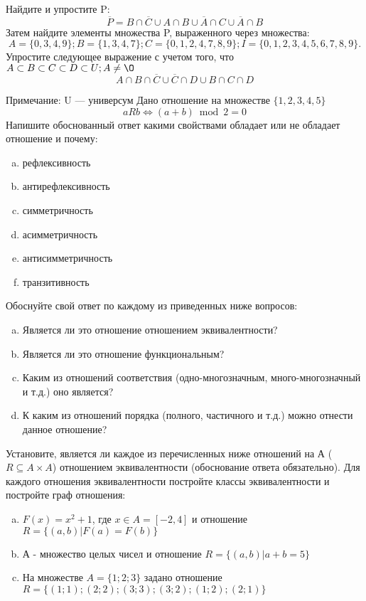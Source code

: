 \documentclass[10pt]{exam}
\begin{document}
\begin{questions}
\question
Найдите и упростите P:
\begin{equation*}
\overline{P} = B \cap \overline{C} \cup A \cap B \cup \overline{A} \cap C \cup \overline{A} \cap B
\end{equation*}
Затем найдите элементы множества P, выраженного через множества:
\begin{equation*}
A = \{0, 3, 4, 9\}; 
B = \{1, 3, 4, 7\};
C = \{0, 1, 2, 4, 7, 8, 9\};
I = \{0, 1, 2, 3, 4, 5, 6, 7, 8, 9\}.
\end{equation*}\question
Упростите следующее выражение с учетом того, что $A\subset B \subset C \subset D \subset U; A \neq \O$
\begin{equation*}
A \cap B  \cap \overline{C} \cup \overline{C} \cap D \cup B \cap C \cap D
\end{equation*}

Примечание: U — универсум\question
Дано отношение на множестве $\{1, 2, 3, 4, 5\}$ 
\begin{equation*}
aRb \iff (a+b) \bmod 2 =0
\end{equation*}
Напишите обоснованный ответ какими свойствами обладает или не обладает отношение и почему:   
\begin{enumerate} [a)]\setcounter{enumi}{0}
\item рефлексивность
\item антирефлексивность
\item симметричность
\item асимметричность
\item антисимметричность
\item транзитивность
\end{enumerate}

Обоснуйте свой ответ по каждому из приведенных ниже вопросов:
\begin{enumerate} [a)]\setcounter{enumi}{0}
    \item Является ли это отношение отношением эквивалентности?
    \item Является ли это отношение функциональным?
    \item Каким из отношений соответствия (одно-многозначным, много-многозначный и т.д.) оно является?
    \item К каким из отношений порядка (полного, частичного и т.д.) можно отнести данное отношение?
\end{enumerate}



\question
Установите, является ли каждое из перечисленных ниже отношений на А ($R \subseteq A \times A$) отношением эквивалентности (обоснование ответа обязательно). Для каждого отношения эквивалентности постройте классы эквивалентности и постройте граф отношения:
\begin{enumerate} [a)]\setcounter{enumi}{0}
\item $F(x)=x^{2}+1$, где $x \in A = [-2, 4]$ и отношение $R = \{(a,b)|F(a) = F(b)\}$
\item А - множество целых чисел и отношение $R = \{(a,b)|a + b = 5\}$
\item На множестве $A = \{1; 2; 3\}$ задано отношение $R = \{(1; 1); (2; 2); (3; 3); (3; 2); (1; 2); (2; 1)\}$


\end{enumerate}
\end{questions}
\end{document}

